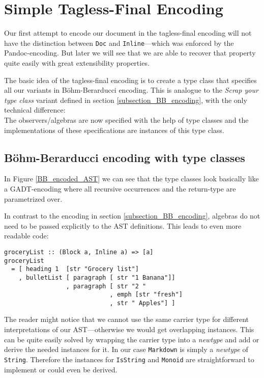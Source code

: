 \section{Simple Tagless-Final Encoding} \label{section_tagless-final}

Our first attempt to encode our document in the tagless-final encoding will not
have the distinction between \texttt{Doc} and \texttt{Inline}—which was enforced
by the Pandoc-encoding. But later we will see that we are able to recover that
property quite easily with great extensibility properties.

The basic idea of the tagless-final encoding is to create a type class that
specifies all our variants in Böhm-Berarducci encoding. This is analogue to the
\emph{Scrap your type class} variant defined in section
\ref{subsection_BB_encoding}, with the only technical difference:\\
The observers/algebras are now specified with the help of type classes and the
implementations of these specifications are instances of this type class.

\subsection{Böhm-Berarducci encoding with type classes}

In Figure \ref{BB_encoded_AST} we can see that the type classes look basically
like a GADT-encoding where all recursive occurrences and the return-type are
parametrized over.

In contrast to the encoding in section \ref{subsection_BB_encoding}, algebras do
not need to be passed explicitly to the AST definitions. This leads to even more
readable code:

\begin{lstlisting}
groceryList :: (Block a, Inline a) => [a]
groceryList
  = [ heading 1  [str "Grocery list"]
    , bulletList [ paragraph [ str "1 Banana"]]
                 , paragraph [ str "2 "
                             , emph [str "fresh"]
                             , str " Apples"] ]
\end{lstlisting}

The reader might notice that we cannot use the same carrier type for different
interpretations of our AST—otherwise we would get overlapping instances. This
can be quite easily solved by wrapping the carrier type into a \emph{newtype}
and add or derive the needed instances for it. In our case \texttt{Markdown} is
simply a \emph{newtype} of \texttt{String}. Therefore the instances for
\texttt{IsString} and \texttt{Monoid} are straightforward to implement or could
even be derived.

